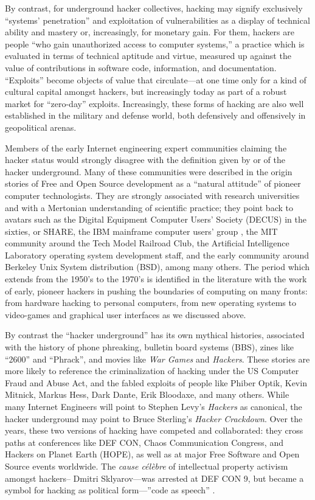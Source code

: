 \documentclass[10pt,letter,oneside]{scrartcl}
\begin{document}
By contrast, for underground hacker collectives, hacking may signify exclusively
``systems' penetration'' and exploitation of vulnerabilities as a display of
technical ability and mastery or, increasingly, for monetary gain.  For them,
hackers are people ``who gain unauthorized access to computer systems,'' a
practice which is evaluated in terms of technical aptitude and virtue, measured
up against the value of contributions in software code, information, and
documentation.  ``Exploits'' become objects of value that circulate---at one
time only for a kind of cultural capital amongst hackers, but increasingly today
as part of a robust market for ``zero-day'' exploits.  Increasingly, these forms
of hacking are also well established in the military and defense world, both
defensively and offensively in geopolitical arenas.

Members of the early Internet engineering expert communities claiming the hacker
status would strongly disagree with the definition given by or of the hacker
underground. Many of these communities were described in the origin stories of
Free and Open Source development as a ``natural attitude'' of pioneer computer
technologists.  They are strongly associated with research universities and with
a Mertonian understanding of scientific practice; they point back to avatars
such as the Digital Equipment Computer Users' Society (DECUS) in the sixties, or
SHARE, the IBM mainframe computer users' group \autocite{akera2001voluntarism},
the MIT community around the Tech Model Railroad Club, the Artificial
Intelligence Laboratory operating system development staff, and the early
community around Berkeley Unix System distribution (BSD), among many others.
The period which extends from the 1950's to the 1970's is identified in the
literature with the work of early, pioneer hackers in pushing the boundaries of
computing on many fronts: from hardware hacking to personal computers, from new
operating systems to video-games and graphical user interfaces as we discussed
above.

By contrast the ``hacker underground'' has its own mythical histories,
associated with the history of phone phreaking, bulletin board systems (BBS),
zines like ``2600'' and ``Phrack'', and movies like \emph{War Games} and
\emph{Hackers}.  These stories are more likely to reference the criminalization
of hacking under the US Computer Fraud and Abuse Act, and the fabled exploits
of people like Phiber Optik, Kevin Mitnick, Markus Hess, Dark Dante, Erik 
Bloodaxe, and many others.  While many Internet Engineers will point to 
Stephen Levy's \emph{Hackers} as canonical, the hacker underground may point to 
Bruce Sterling's \emph{Hacker Crackdown}.  Over the years, these two versions of
hacking have competed and collaborated: they cross paths at conferences like
DEF CON, Chaos Communication Congress, and Hackers on Planet Earth (HOPE), as 
well as at major Free Software and Open Source events worldwide.  The 
\emph{cause célèbre} of intellectual property activism amongst hackers--
Dmitri Sklyarov---was arrested at DEF CON 9, but became a symbol for 
hacking as political form---''code as speech'' \autocite{coleman_code_2009}. 
\end{document}
